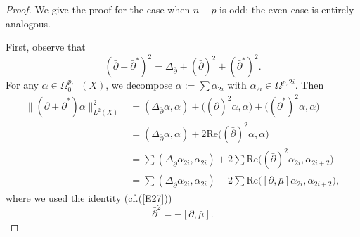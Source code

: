 \documentclass[12pt, twoside]{article}
\theoremstyle{definition}
\numberwithin{equation}{section}
\def \a {\alpha }
\def \De {\Delta}
\def\Om{\Omega}
\def\pa{\partial}
\begin{document}
\begin{proof}
	We give the proof for the case when $n-p$ is odd; the even case is entirely analogous. 
	
	First, observe that
	\[({\bar{\partial}+\bar{\partial}^{\ast}})^{2}=\De_{\bar{\pa}}+(\bar{\pa})^{2}+(\bar{\pa}^{\ast})^{2}. \]
	For any $\a\in\Om_{0}^{p,+}(X)$, we decompose  $\a:=\sum\a_{2i}$ with $\a_{2i}\in\Om^{p,2i}$. Then
	\begin{equation*}
	\begin{split}
	\|({\bar{\partial}+\bar{\partial}^{\ast}})\a\|_{L^{2}(X)}^{2}
	&=(\De_{\bar{\pa}}\a,\a)+\Big((\bar{\pa})^{2}\a,\a\Big)+\Big((\bar{\pa}^{\ast})^2\a,\a\Big)\\
	&=(\De_{\bar{\pa}}\a,\a)+2\mathrm{Re}\Big((\bar{\pa})^{2}\a,\a\Big)\\
	&=\sum(\De_{\bar{\pa}}\a_{2i},\a_{2i})+2\sum\mathrm{Re}\Big((\bar{\pa})^{2}\a_{2i},\a_{2i+2}\Big)\\
	&=\sum(\De_{\bar{\pa}}\a_{2i},\a_{2i})-2\sum\mathrm{Re}\Big([\pa,\bar{\mu}]\a_{2i},\a_{2i+2}\Big),
	\end{split}
	\end{equation*}
	where we used the identity (cf.(\ref{E27}))
	\[ \bar{\pa}^{2}=-[\pa,\bar{\mu}].\]
	

\end{proof}
\end{document}
